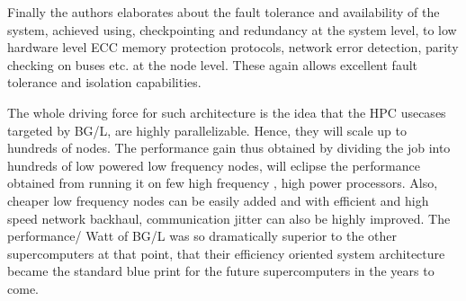 \documentclass[a4paper,12 pt]{article}
\begin{document}
Finally the authors elaborates about the fault tolerance and availability  of the system, achieved using, checkpointing and redundancy at the system level, to low hardware level ECC memory protection protocols, network error detection, parity checking on buses etc. at the node level. These again allows excellent fault tolerance and isolation capabilities.

The whole driving force for such architecture is the idea that the HPC usecases targeted by BG/L, are highly parallelizable. Hence, they will scale up to hundreds of nodes. The performance gain thus obtained by dividing the job into hundreds of low powered low frequency nodes, will eclipse the performance obtained from running it on few high frequency , high power processors. Also, cheaper low frequency nodes can be easily added and with efficient and high speed network backhaul, communication jitter can also be highly improved. The performance/ Watt of BG/L was so dramatically superior to the other supercomputers at that point, that their efficiency oriented system architecture became the standard blue print for the future supercomputers in the years to come.
\end{document}
